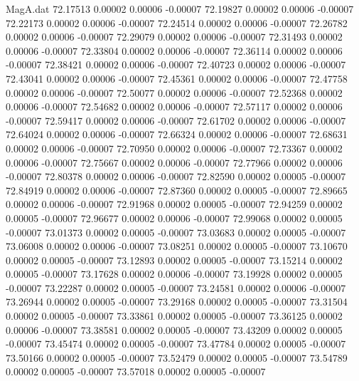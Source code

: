 \begin{filecontents}{MagA.dat}
  72.17513    0.00002    0.00006   -0.00007
  72.19827    0.00002    0.00006   -0.00007
  72.22173    0.00002    0.00006   -0.00007
  72.24514    0.00002    0.00006   -0.00007
  72.26782    0.00002    0.00006   -0.00007
  72.29079    0.00002    0.00006   -0.00007
  72.31493    0.00002    0.00006   -0.00007
  72.33804    0.00002    0.00006   -0.00007
  72.36114    0.00002    0.00006   -0.00007
  72.38421    0.00002    0.00006   -0.00007
  72.40723    0.00002    0.00006   -0.00007
  72.43041    0.00002    0.00006   -0.00007
  72.45361    0.00002    0.00006   -0.00007
  72.47758    0.00002    0.00006   -0.00007
  72.50077    0.00002    0.00006   -0.00007
  72.52368    0.00002    0.00006   -0.00007
  72.54682    0.00002    0.00006   -0.00007
  72.57117    0.00002    0.00006   -0.00007
  72.59417    0.00002    0.00006   -0.00007
  72.61702    0.00002    0.00006   -0.00007
  72.64024    0.00002    0.00006   -0.00007
  72.66324    0.00002    0.00006   -0.00007
  72.68631    0.00002    0.00006   -0.00007
  72.70950    0.00002    0.00006   -0.00007
  72.73367    0.00002    0.00006   -0.00007
  72.75667    0.00002    0.00006   -0.00007
  72.77966    0.00002    0.00006   -0.00007
  72.80378    0.00002    0.00006   -0.00007
  72.82590    0.00002    0.00005   -0.00007
  72.84919    0.00002    0.00006   -0.00007
  72.87360    0.00002    0.00005   -0.00007
  72.89665    0.00002    0.00006   -0.00007
  72.91968    0.00002    0.00005   -0.00007
  72.94259    0.00002    0.00005   -0.00007
  72.96677    0.00002    0.00006   -0.00007
  72.99068    0.00002    0.00005   -0.00007
  73.01373    0.00002    0.00005   -0.00007
  73.03683    0.00002    0.00005   -0.00007
  73.06008    0.00002    0.00006   -0.00007
  73.08251    0.00002    0.00005   -0.00007
  73.10670    0.00002    0.00005   -0.00007
  73.12893    0.00002    0.00005   -0.00007
  73.15214    0.00002    0.00005   -0.00007
  73.17628    0.00002    0.00006   -0.00007
  73.19928    0.00002    0.00005   -0.00007
  73.22287    0.00002    0.00005   -0.00007
  73.24581    0.00002    0.00006   -0.00007
  73.26944    0.00002    0.00005   -0.00007
  73.29168    0.00002    0.00005   -0.00007
  73.31504    0.00002    0.00005   -0.00007
  73.33861    0.00002    0.00005   -0.00007
  73.36125    0.00002    0.00006   -0.00007
  73.38581    0.00002    0.00005   -0.00007
  73.43209    0.00002    0.00005   -0.00007
  73.45474    0.00002    0.00005   -0.00007
  73.47784    0.00002    0.00005   -0.00007
  73.50166    0.00002    0.00005   -0.00007
  73.52479    0.00002    0.00005   -0.00007
  73.54789    0.00002    0.00005   -0.00007
  73.57018    0.00002    0.00005   -0.00007

\end{filecontents}

